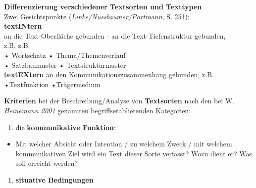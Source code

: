 \documentclass[
  letterpaper,
]{scrbook}
\providecommand{\tightlist}{%
  \setlength{\itemsep}{0pt}\setlength{\parskip}{0pt}}\usepackage{longtable,booktabs,array}
\begin{document}
\textbf{Differenzierung verschiedener Textsorten und Texttypen}\\
Zwei Gesichtspunkte (\emph{Linke/Nussbaumer/Portmann}, S. 251):\\

\textbf{textINtern}\\
an die Text-Oberfläche gebunden - an die Text-Tiefenstruktur gebunden,\\
z.B. z.B.\\
• Wortschatz • Thema/Themenverlauf\\
• Satzbaumuster • Textstrukturmuster\\

\textbf{textEXtern} an den Kommunikationszusammenhang gebunden, z.B.
•Textfunktion •Trägermedium

\textbf{Kriterien} bei der Beschreibung/Analyse von \textbf{Textsorten}
nach den bei W. \emph{Heinemann 2001} genannten begriffsetablierenden
Kategorien:

\begin{enumerate}
\def\labelenumi{\arabic{enumi}.}
\tightlist
\item
  die \textbf{kommunikative Funktion}:\\
\end{enumerate}

\begin{itemize}
\tightlist
\item
  Mit welcher Absicht oder Intention / zu welchem Zweck / mit welchem
  kommunikativen Ziel wird ein Text dieser Sorte verfasst? Wozu dient
  er? Was soll erreicht werden?
\end{itemize}

\begin{enumerate}
\def\labelenumi{\arabic{enumi}.}
\setcounter{enumi}{1}
\tightlist
\item
  \textbf{situative Bedingungen}\\
\end{enumerate}
\end{document}
